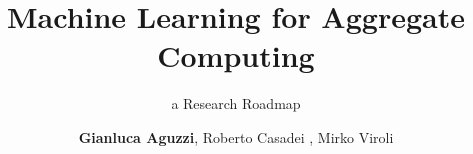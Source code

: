 

\title{
  \textbf{Machine Learning for Aggregate Computing}
}
\subtitle{
  a Research Roadmap
}
\author[G.Aguzzi]{
  \textbf{Gianluca Aguzzi}, Roberto Casadei , Mirko Viroli 
}
